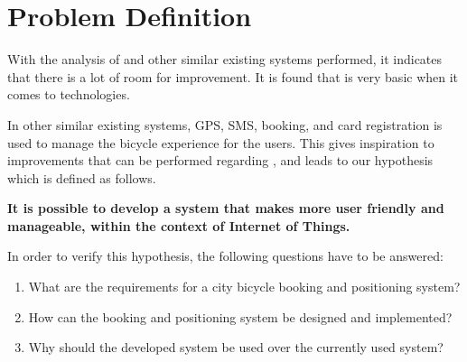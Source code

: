 \section{Problem Definition}\label{sec:probdef}
With the analysis of \bycykel and other similar existing systems performed, it indicates that there is a lot of room for improvement.
It is found that \bycykel is very basic when it comes to technologies.

In other similar existing systems, GPS, SMS, booking, and card registration is used to manage the bicycle experience for the users.
This gives inspiration to improvements that can be performed regarding \bycykelwithoutspace, and leads to our hypothesis which is defined as follows.

\begin{center}
\textbf{It is possible to develop a system that makes \bycykel more user friendly and manageable, within the context of Internet of Things.}
\end{center}

In order to verify this hypothesis, the following questions have to be answered:

\begin{enumerate}
	\item What are the requirements for a city bicycle booking and positioning system?
	\item How can the booking and positioning system be designed and implemented?
	\item Why should the developed system be used over the currently used system?
\end{enumerate}